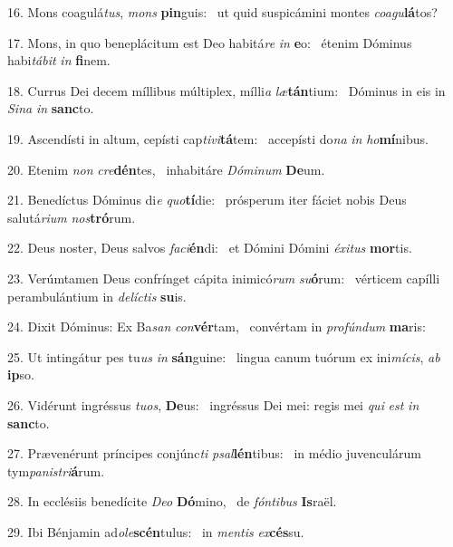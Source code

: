 16. Mons coagulá\textit{tus}, \textit{mons} \textbf{pin}guis: \ast\  ut quid suspicámini montes \textit{co}\textit{a}\textit{gu}\textbf{lá}tos?\

17. Mons, in quo beneplácitum est Deo habitá\textit{re} \textit{in} \textbf{e}o: \ast\  étenim Dóminus habi\textit{tá}\textit{bit} \textit{in} \textbf{fi}nem.\

18. Currus Dei decem míllibus múltiplex, mílli\textit{a} \textit{læ}\textbf{tán}tium: \ast\  Dóminus in eis in \textit{Si}\textit{na} \textit{in} \textbf{sanc}to.\

19. Ascendísti in altum, cepísti cap\textit{ti}\textit{vi}\textbf{tá}tem: \ast\  accepísti do\textit{na} \textit{in} \textit{ho}\textbf{mí}nibus.\

20. Etenim \textit{non} \textit{cre}\textbf{dén}tes, \ast\  inhabitáre \textit{Dó}\textit{mi}\textit{num} \textbf{De}um.\

21. Benedíctus Dóminus di\textit{e} \textit{quo}\textbf{tí}die: \ast\  prósperum iter fáciet nobis Deus salutá\textit{ri}\textit{um} \textit{nos}\textbf{tró}rum.\

22. Deus noster, Deus salvos \textit{fa}\textit{ci}\textbf{én}di: \ast\  et Dómini Dómini \textit{éx}\textit{i}\textit{tus} \textbf{mor}tis.\

23. Verúmtamen Deus confrínget cápita inimicó\textit{rum} \textit{su}\textbf{ó}rum: \ast\  vérticem capílli perambulántium in \textit{de}\textit{líc}\textit{tis} \textbf{su}is.\

24. Dixit Dóminus: Ex Ba\textit{san} \textit{con}\textbf{vér}tam, \ast\  convértam in \textit{pro}\textit{fún}\textit{dum} \textbf{ma}ris:\

25. Ut intingátur pes tu\textit{us} \textit{in} \textbf{sán}guine: \ast\  lingua canum tuórum ex ini\textit{mí}\textit{cis}, \textit{ab} \textbf{ip}so.\

26. Vidérunt ingréssus \textit{tu}\textit{os}, \textbf{De}us: \ast\  ingréssus Dei mei: regis mei \textit{qui} \textit{est} \textit{in} \textbf{sanc}to.\

27. Prævenérunt príncipes conjúnc\textit{ti} \textit{psal}\textbf{lén}tibus: \ast\  in médio juvenculárum tym\textit{pa}\textit{nis}\textit{tri}\textbf{á}rum.\

28. In ecclésiis benedícite \textit{De}\textit{o} \textbf{Dó}mino, \ast\  de \textit{fón}\textit{ti}\textit{bus} \textbf{Is}raël.\

29. Ibi Bénjamin ad\textit{o}\textit{le}\textbf{scén}tulus: \ast\  in \textit{men}\textit{tis} \textit{ex}\textbf{cés}su.\

